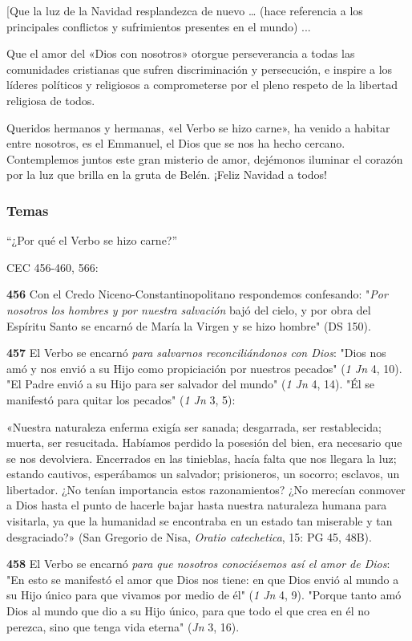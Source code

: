 \documentclass[]{article}
\begin{document}
{[}Que la luz de la Navidad resplandezca de nuevo \ldots{} (hace
referencia a los principales conflictos y sufrimientos presentes en el
mundo) ...

Que el amor del «Dios con nosotros» otorgue perseverancia a todas las
comunidades cristianas que sufren discriminación y persecución, e
inspire a los líderes políticos y religiosos a comprometerse por el
pleno respeto de la libertad religiosa de todos.

Queridos hermanos y hermanas, «el Verbo se hizo carne», ha venido a
habitar entre nosotros, es el Emmanuel, el Dios que se nos ha hecho
cercano. Contemplemos juntos este gran misterio de amor, dejémonos
iluminar el corazón por la luz que brilla en la gruta de Belén. ¡Feliz
Navidad a todos!



\subsubsection{Temas}\label{temas-7}

``¿Por qué el Verbo se hizo carne?''

CEC 456-460, 566:

\textbf{456} Con el Credo Niceno-Constantinopolitano respondemos
confesando: "\emph{Por nosotros los hombres y por nuestra salvación}
bajó del cielo, y por obra del Espíritu Santo se encarnó de María la
Virgen y se hizo hombre" (DS 150).

\textbf{457} El Verbo se encarnó \emph{para salvarnos reconciliándonos
con Dios}: "Dios nos amó y nos envió a su Hijo como propiciación por
nuestros pecados" (\emph{1 Jn} 4, 10). "El Padre envió a su Hijo para
ser salvador del mundo" (\emph{1 Jn} 4, 14). "Él se manifestó para
quitar los pecados" (\emph{1 Jn} 3, 5):

«Nuestra naturaleza enferma exigía ser sanada; desgarrada, ser
restablecida; muerta, ser resucitada. Habíamos perdido la posesión del
bien, era necesario que se nos devolviera. Encerrados en las tinieblas,
hacía falta que nos llegara la luz; estando cautivos, esperábamos un
salvador; prisioneros, un socorro; esclavos, un libertador. ¿No tenían
importancia estos razonamientos? ¿No merecían conmover a Dios hasta el
punto de hacerle bajar hasta nuestra naturaleza humana para visitarla,
ya que la humanidad se encontraba en un estado tan miserable y tan
desgraciado?» (San Gregorio de Nisa, \emph{Oratio catechetica}, 15: PG
45, 48B).

\textbf{458} El Verbo se encarnó \emph{para que nosotros conociésemos
así el amor de Dios}: "En esto se manifestó el amor que Dios nos tiene:
en que Dios envió al mundo a su Hijo único para que vivamos por medio de
él" (\emph{1 Jn} 4, 9). "Porque tanto amó Dios al mundo que dio a su
Hijo único, para que todo el que crea en él no perezca, sino que tenga
vida eterna" (\emph{Jn} 3, 16).
\end{document}
